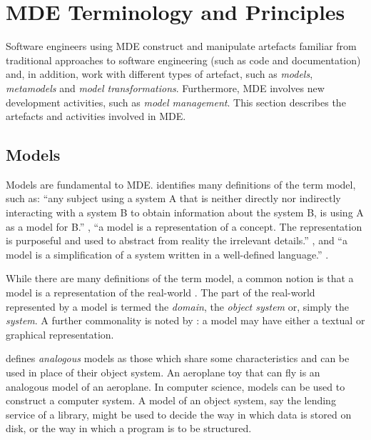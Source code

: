 
\section{MDE Terminology and Principles}
\label{sec:mde_terms}
Software engineers using MDE construct and manipulate artefacts familiar from traditional approaches to software engineering (such as code and documentation) and, in addition, work with different types of artefact, such as \emph{models}, \emph{metamodels} and \emph{model transformations}. Furthermore, MDE involves new development activities, such as \emph{model management}. This section describes the artefacts and activities involved in MDE.

\subsection{Models}
\label{subsec:models}
Models are fundamental to MDE. \cite{kurtev04thesis} identifies many definitions of the term model, such as: ``any subject using a system A that is neither directly nor indirectly interacting with a system B to obtain information about the system B, is using A as a model for B.'' \cite{apostel60models}, ``a model is a representation of a concept. The representation is purposeful and used to abstract from reality the irrelevant details.'' \cite{starfield90model}, and ``a model is a simplification of a system written in a well-defined language.'' \cite{bezivin01definition}. 

While there are many definitions of the term model, a common notion is that a model is a representation of the real-world \cite[pg12]{kurtev04thesis}. The part of the real-world represented by a model is termed the \emph{domain}, the \emph{object system} or, simply the \emph{system}. A further commonality is noted by \cite{kolovos06eol}: a model may have either a textual or graphical representation.

\cite{ackoff62scientific} defines \emph{analogous} models as those which share some characteristics and can be used in place of their object system. An aeroplane toy that can fly is an analogous model of an aeroplane. In computer science, models can be used to construct a computer system. A model of an object system, say the lending service of a library, might be used to decide the way in which data is stored on disk, or the way in which a program is to be structured.

